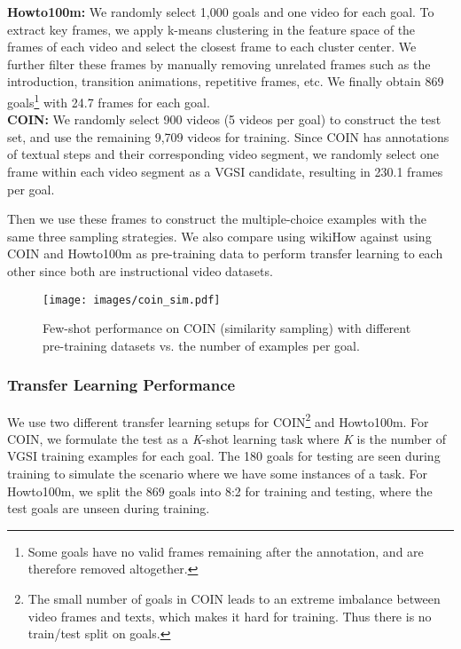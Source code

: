 \documentclass[11pt]{article}
\begin{document}
\noindent
\textbf{Howto100m:} We randomly select 1,000 goals and one video for each goal. To extract key frames, we apply k-means clustering in the feature space of the frames of each video and select the closest frame to each cluster center. We further filter these frames by manually removing unrelated frames such as the introduction, transition animations, repetitive frames, etc. We finally obtain 869 goals\footnote{Some goals have no valid frames remaining after the annotation, and are therefore removed altogether.} with 24.7 frames for each goal.\\
\textbf{COIN:} We randomly select 900 videos (5 videos per goal) to construct the test set, and use the remaining 9,709 videos for training. Since COIN has annotations of textual steps and their corresponding video segment, we randomly select one frame within each video segment as a VGSI candidate, resulting in 230.1 frames per goal.


Then we use these frames to construct the multiple-choice examples with the same three sampling strategies. We also compare using wikiHow against using COIN and Howto100m as pre-training data to perform transfer learning to each other since both are instructional video datasets.

\begin{figure}[!t]
    \texttt{[image: images/coin\_sim.pdf]}
    \caption{Few-shot performance on COIN (similarity sampling) with different pre-training datasets vs. the number of examples per goal.}
    \label{fig:coin sim}
    \vspace{-0.1in}
\end{figure}

\subsubsection{Transfer Learning Performance}
We use two different transfer learning setups for COIN\footnote{The small number of goals in COIN leads to an extreme imbalance between video frames and texts, which makes it hard for training. Thus there is no train/test split on goals.} and Howto100m. For COIN, we formulate the test as a \textit{K}-shot learning task where \textit{K} is the number of VGSI training examples for each goal. The 180 goals for testing are seen during training to simulate the scenario where we have some instances of a task. For Howto100m, we split the 869 goals into 8:2 for training and testing, where the test goals are unseen during training. 
\end{document}
